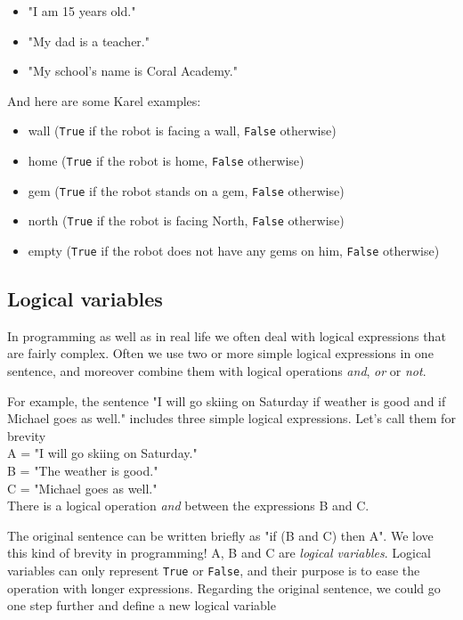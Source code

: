 \documentclass[article,A4,12pt]{llncs}
\begin{document}
\begin{itemize}
\item "I am 15 years old."
\item "My dad is a teacher."
\item "My school's name is Coral Academy."
\end{itemize}
And here are some Karel examples:
\begin{itemize}
\item wall ({\tt True} if the robot is facing a wall, {\tt False} otherwise)
\item home ({\tt True} if the robot is home, {\tt False} otherwise)
\item gem ({\tt True} if the robot stands on a gem, {\tt False} otherwise)
\item north ({\tt True} if the robot is facing North, {\tt False} otherwise)
\item empty ({\tt True} if the robot does not have any gems on him, {\tt False} otherwise)
\end{itemize}

\subsection{Logical variables}

In programming as well as in real life we often deal with logical expressions that are 
fairly complex. Often we use two or more simple logical expressions in one sentence, 
and moreover combine them with logical operations {\em and}, {\em or} or {\em not}.

For example, the sentence "I will go skiing on Saturday if weather is good and if 
Michael goes as well." includes three simple logical expressions. Let's call 
them for brevity\\

\noindent
A = "I will go skiing on Saturday."\\
B = "The weather is good."\\
C = "Michael goes as well."\\

\noindent
There is a logical operation {\em and} between the expressions B and C.

The original sentence can be written briefly as "if (B and C) then A". We love this kind of 
brevity in programming! A, B and C are {\em logical variables}. Logical variables 
can only represent {\tt True} or {\tt False}, and their purpose is to ease the operation with 
longer expressions.
Regarding the original sentence, we could go one step further and define a new logical variable\\
\end{document}
